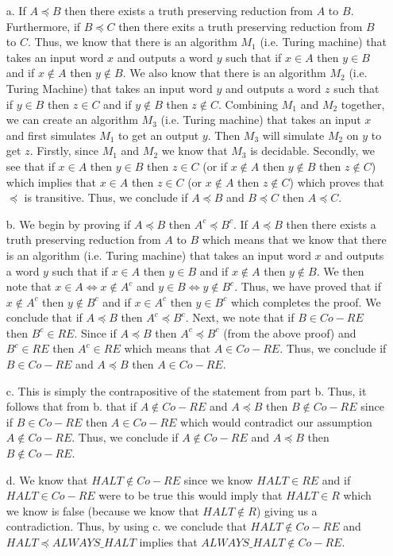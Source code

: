 \documentclass [10pt]{article}
\newcommand{\reduces}{\preceq}%
\begin{document}
\begin{enumerate}
\begin{enumerate}
		\item[a.]If $A\reduces B$ then there exists a truth preserving reduction from $A$ to $B$. Furthermore, if $B\reduces C$ then there exits a truth preserving reduction from $B$ to $C$. Thus, we know that there is an algorithm $M_{1}$ (i.e. Turing machine) that takes an input word $x$ and outputs a word $y$ such that if $x\in A$ then $y\in B$ and if $x\notin A$ then $y\notin B$. We also know that there is an algorithm $M_{2}$ (i.e. Turing Machine) that takes an input word $y$ and outputs a word $z$ such that if $y\in B$ then $z\in C$ and if $y\notin B$ then $z\notin C$. Combining $M_{1}$ and $M_{2}$ together, we can create an algorithm $M_{3}$ (i.e. Turing machine) that takes an input $x$ and first simulates $M_{1}$ to get an output $y$. Then $M_{3}$ will simulate $M_{2}$ on $y$ to get $z$. Firstly, since $M_{1}$ and $M_{2}$ we know that $M_{3}$ is decidable. Secondly, we see that if $x\in A$ then $y\in B$ then $z\in C$ (or if $x\notin A$ then $y\notin B$ then $z\notin C$) which implies that $x\in A$ then $z\in C$ (or $x\notin A$ then $z\notin C$) which proves that $\reduces$ is transitive. Thus, we conclude if $A\reduces B$ and $B\reduces C$ then $A\reduces C$.
		\item[b.]We begin by proving if $A\reduces B$ then $A^{c}\reduces B^{c}$. If $A\reduces B$ then there exists a truth preserving reduction from $A$ to $B$ which means that we know that there is an algorithm (i.e. Turing machine) that takes an input word $x$ and outputs a word $y$ such that if $x\in A$ then $y\in B$ and if $x\notin A$ then $y\notin B$. We then note that $x\in A\iff x\notin A^{c}$ and $y\in B\iff y\notin B^{c}$. Thus, we have proved that if $x\notin A^{c}$ then $y\notin B^{c}$ and if $x\in A^{c}$ then $y\in B^{c}$ which completes the proof. We conclude that if $A\reduces B$ then $A^{c}\reduces B^{c}$. Next, we note that if $B\in Co-RE$ then $B^{c}\in RE$. Since if $A\reduces B$ then $A^{c}\reduces B^{c}$ (from the above proof) and $B^{c}\in RE$ then $A^{c}\in RE$ which means that $A\in Co-RE$. Thus, we conclude if $B\in Co-RE$ and $A\reduces B$ then $A\in Co-RE$.
		\item[c.]This is simply the contrapositive of the statement from part b. Thus, it follows that from b. that if $A\notin Co-RE$ and $A\reduces B$ then $B\notin Co-RE$ since if $B\in Co-RE$ then $A\in Co-RE$ which would contradict our assumption $A\notin Co-RE$. Thus, we conclude if $A\notin Co-RE$ and $A\reduces B$ then $B\notin Co-RE$.
		\item[d.]We know that $HALT\notin Co-RE$ since we know $HALT\in RE$ and if $HALT\in Co-RE$ were to be true this would imply that $HALT\in R$ which we know is false (because we know that $HALT\notin R$) giving us a contradiction. Thus, by using c. we conclude that $HALT\notin Co-RE$ and $HALT\reduces ALWAYS\_HALT$ implies that $ALWAYS\_HALT\notin Co-RE$.

\end{enumerate}
\end{enumerate}
\end{document}
